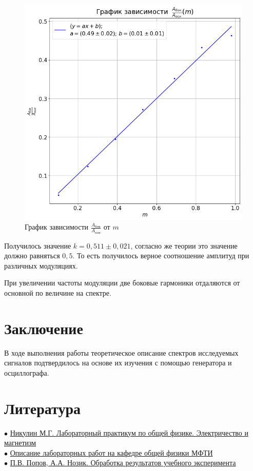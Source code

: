 \documentclass[a4paper, 12pt]{article}%
\begin{document}
\begin{figure}[!h]
    \centering
    \includegraphics[width = 13 cm]{images/3_appr.png}
    \caption{График зависимости $\frac{A_{\text{бок}}}{A_{\text{осн}}}$ от $m$}
\end{figure}

Получилось значение $k = 0,511 \pm 0,021$, согласно же теории это значение должно равняться $0,5$. То есть получилось верное соотношение амплитуд при различных модуляциях.

При увеличении частоты модуляции две боковые гармоники отдаляются от основной по величине на спектре.

\newpage

\section{Заключение}

В ходе выполнения работы теоретическое описание спектров исследуемых сигналов подтвердилось на основе их изучения с помощью генератора и осциллографа.
 
\section{Литература}


$\bullet$ \href{https://vk.com/doc-139677307_612194888}{Никулин М.Г. Лабораторный практикум по общей физике. Электричество и магнетизм}\\
$\bullet$ \href{https://mipt.ru/education/chair/physics/S_III/lab_el.php}{Описание лабораторных работ на кафедре общей физики МФТИ}\\
$\bullet$ \href{https://vk.com/doc-139677307_612194961}{П.В. Попов, А.А. Нозик. Обработка результатов учебного эксперимента}
\end{document}
